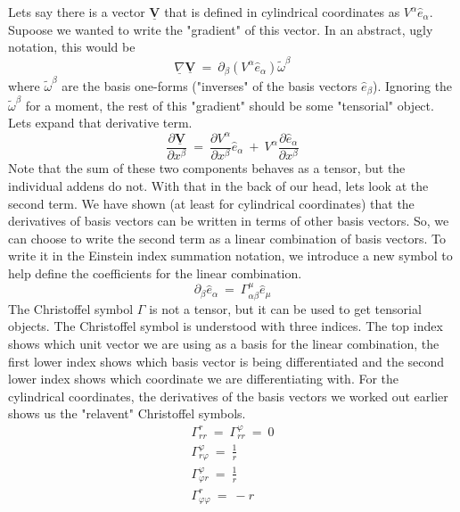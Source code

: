 \hskip 25pt Lets say there is a vector $\underline{\mathbf{V}}$ that is defined in cylindrical coordinates as
$V^{\alpha}\hat{e}_{\alpha}$.  Supoose we wanted to write the "gradient" of this vector.  In an abstract,
ugly notation, this would be
\begin{equation}
  \underline{\nabla}\underline{\mathbf{V}}\ =\
  \partial_{\beta}\left (V^{\alpha}\hat{e}_{\alpha}\right )\widetilde{\omega}^{\beta}
\end{equation}
where $\widetilde{\omega}^{\beta}$ are the basis one-forms ("inverses" of the basis vectors $\hat{e}_{\beta}$).
Ignoring the $\widetilde{\omega}^{\beta}$ for a moment, the rest of this "gradient" should be some "tensorial"
object.  Lets expand that derivative term.
\begin{equation}
  \frac{\partial\underline{\mathbf{V}}}{\partial x^{\beta}}\ =\
  \frac{\partial V^{\alpha}}{\partial x^{\beta}}\hat{e}_{\alpha}\ +\
  V^{\alpha}\frac{\partial\hat{e}_{\alpha}}{\partial x^{\beta}}
\end{equation}
Note that the sum of these two components behaves as a tensor, but the individual addens do not.  With that in the back of our
head, lets look at the second term.  We have shown (at least for cylindrical coordinates) that the derivatives of
basis vectors can be written in terms of other basis vectors.  So, we can choose to write the second term as a
linear combination of basis vectors.  To write it in the Einstein index summation notation, we introduce a new symbol
to help define the coefficients for the linear combination.
\begin{equation}
  \partial_{\beta}\hat{e}_{\alpha}\ =\ \Gamma_{\alpha\beta}^{\mu}\hat{e}_{\mu}
\end{equation}
The Christoffel symbol $\Gamma$ is not a tensor, but it can be used to get tensorial objects.  The
Christoffel symbol is understood with three indices.  The top index shows which unit vector we are using as a basis for
the linear combination, the first lower index shows which basis vector is being differentiated and the
second lower index shows which coordinate we are differentiating with.  For the cylindrical
coordinates, the derivatives of the basis vectors we worked out earlier shows us the "relavent" Christoffel symbols.
\begin{gather}
  \Gamma^{r}_{rr}\ =\ \Gamma^{\varphi}_{rr}\ =\ 0 \\
  \Gamma^{\varphi}_{r\varphi}\ =\ \frac{1}{r} \\
  \Gamma^{\varphi}_{\varphi r}\ =\ \frac{1}{r} \\
  \Gamma^{r}_{\varphi\varphi}\ =\ -r
\end{gather}
